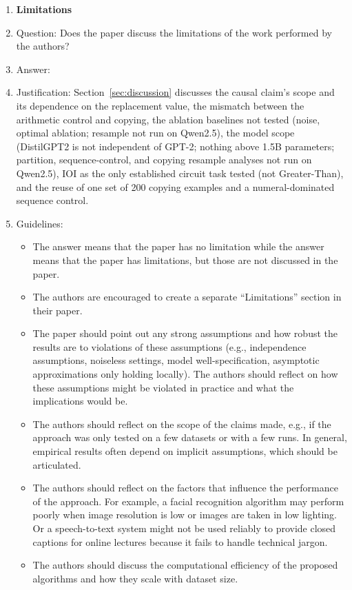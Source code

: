 \begin{enumerate}
\item {\bf Limitations}
    \item[] Question: Does the paper discuss the limitations of the work performed by the authors?
    \item[] Answer: \answerYes{}
    \item[] Justification: Section~\ref{sec:discussion} discusses the causal claim's scope and its dependence on the replacement value, the mismatch between the arithmetic control and copying, the ablation baselines not tested (noise, optimal ablation; resample not run on Qwen2.5), the model scope (DistilGPT2 is not independent of GPT-2; nothing above 1.5B parameters; partition, sequence-control, and copying resample analyses not run on Qwen2.5), IOI as the only established circuit task tested (not Greater-Than), and the reuse of one set of 200 copying examples and a numeral-dominated sequence control.
    \item[] Guidelines:
    \begin{itemize}
        \item The answer \answerNA{} means that the paper has no limitation while the answer \answerNo{} means that the paper has limitations, but those are not discussed in the paper. 
        \item The authors are encouraged to create a separate ``Limitations'' section in their paper.
        \item The paper should point out any strong assumptions and how robust the results are to violations of these assumptions (e.g., independence assumptions, noiseless settings, model well-specification, asymptotic approximations only holding locally). The authors should reflect on how these assumptions might be violated in practice and what the implications would be.
        \item The authors should reflect on the scope of the claims made, e.g., if the approach was only tested on a few datasets or with a few runs. In general, empirical results often depend on implicit assumptions, which should be articulated.
        \item The authors should reflect on the factors that influence the performance of the approach. For example, a facial recognition algorithm may perform poorly when image resolution is low or images are taken in low lighting. Or a speech-to-text system might not be used reliably to provide closed captions for online lectures because it fails to handle technical jargon.
        \item The authors should discuss the computational efficiency of the proposed algorithms and how they scale with dataset size.

\end{itemize}
\end{enumerate}
